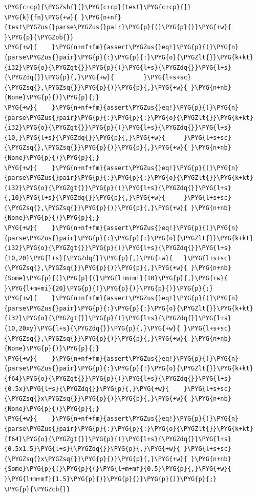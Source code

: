 \begin{Verbatim}[commandchars=\\\{\},breaklines=true,breakanywhere=true,fontsize=\codefont,xleftmargin=17bp]
\PYG{c+cp}{\PYGZsh{}[}\PYG{c+cp}{test}\PYG{c+cp}{]}
\PYG{k}{fn}\PYG{+w}{ }\PYG{n+nf}{test\PYGZus{}parse\PYGZus{}pair}\PYG{p}{(}\PYG{p}{)}\PYG{+w}{ }\PYG{p}{\PYGZob{}}
\PYG{+w}{    }\PYG{n+nf+fm}{assert\PYGZus{}eq!}\PYG{p}{(}\PYG{n}{parse\PYGZus{}pair}\PYG{p}{:}\PYG{p}{:}\PYG{o}{\PYGZlt{}}\PYG{k+kt}{i32}\PYG{o}{\PYGZgt{}}\PYG{p}{(}\PYG{l+s}{\PYGZdq{}}\PYG{l+s}{\PYGZdq{}}\PYG{p}{,}\PYG{+w}{        }\PYG{l+s+sc}{\PYGZsq{},\PYGZsq{}}\PYG{p}{)}\PYG{p}{,}\PYG{+w}{ }\PYG{n+nb}{None}\PYG{p}{)}\PYG{p}{;}
\PYG{+w}{    }\PYG{n+nf+fm}{assert\PYGZus{}eq!}\PYG{p}{(}\PYG{n}{parse\PYGZus{}pair}\PYG{p}{:}\PYG{p}{:}\PYG{o}{\PYGZlt{}}\PYG{k+kt}{i32}\PYG{o}{\PYGZgt{}}\PYG{p}{(}\PYG{l+s}{\PYGZdq{}}\PYG{l+s}{10,}\PYG{l+s}{\PYGZdq{}}\PYG{p}{,}\PYG{+w}{     }\PYG{l+s+sc}{\PYGZsq{},\PYGZsq{}}\PYG{p}{)}\PYG{p}{,}\PYG{+w}{ }\PYG{n+nb}{None}\PYG{p}{)}\PYG{p}{;}
\PYG{+w}{    }\PYG{n+nf+fm}{assert\PYGZus{}eq!}\PYG{p}{(}\PYG{n}{parse\PYGZus{}pair}\PYG{p}{:}\PYG{p}{:}\PYG{o}{\PYGZlt{}}\PYG{k+kt}{i32}\PYG{o}{\PYGZgt{}}\PYG{p}{(}\PYG{l+s}{\PYGZdq{}}\PYG{l+s}{,10}\PYG{l+s}{\PYGZdq{}}\PYG{p}{,}\PYG{+w}{     }\PYG{l+s+sc}{\PYGZsq{},\PYGZsq{}}\PYG{p}{)}\PYG{p}{,}\PYG{+w}{ }\PYG{n+nb}{None}\PYG{p}{)}\PYG{p}{;}
\PYG{+w}{    }\PYG{n+nf+fm}{assert\PYGZus{}eq!}\PYG{p}{(}\PYG{n}{parse\PYGZus{}pair}\PYG{p}{:}\PYG{p}{:}\PYG{o}{\PYGZlt{}}\PYG{k+kt}{i32}\PYG{o}{\PYGZgt{}}\PYG{p}{(}\PYG{l+s}{\PYGZdq{}}\PYG{l+s}{10,20}\PYG{l+s}{\PYGZdq{}}\PYG{p}{,}\PYG{+w}{   }\PYG{l+s+sc}{\PYGZsq{},\PYGZsq{}}\PYG{p}{)}\PYG{p}{,}\PYG{+w}{ }\PYG{n+nb}{Some}\PYG{p}{(}\PYG{p}{(}\PYG{l+m+mi}{10}\PYG{p}{,}\PYG{+w}{ }\PYG{l+m+mi}{20}\PYG{p}{)}\PYG{p}{)}\PYG{p}{)}\PYG{p}{;}
\PYG{+w}{    }\PYG{n+nf+fm}{assert\PYGZus{}eq!}\PYG{p}{(}\PYG{n}{parse\PYGZus{}pair}\PYG{p}{:}\PYG{p}{:}\PYG{o}{\PYGZlt{}}\PYG{k+kt}{i32}\PYG{o}{\PYGZgt{}}\PYG{p}{(}\PYG{l+s}{\PYGZdq{}}\PYG{l+s}{10,20xy}\PYG{l+s}{\PYGZdq{}}\PYG{p}{,}\PYG{+w}{ }\PYG{l+s+sc}{\PYGZsq{},\PYGZsq{}}\PYG{p}{)}\PYG{p}{,}\PYG{+w}{ }\PYG{n+nb}{None}\PYG{p}{)}\PYG{p}{;}
\PYG{+w}{    }\PYG{n+nf+fm}{assert\PYGZus{}eq!}\PYG{p}{(}\PYG{n}{parse\PYGZus{}pair}\PYG{p}{:}\PYG{p}{:}\PYG{o}{\PYGZlt{}}\PYG{k+kt}{f64}\PYG{o}{\PYGZgt{}}\PYG{p}{(}\PYG{l+s}{\PYGZdq{}}\PYG{l+s}{0.5x}\PYG{l+s}{\PYGZdq{}}\PYG{p}{,}\PYG{+w}{    }\PYG{l+s+sc}{\PYGZsq{}x\PYGZsq{}}\PYG{p}{)}\PYG{p}{,}\PYG{+w}{ }\PYG{n+nb}{None}\PYG{p}{)}\PYG{p}{;}
\PYG{+w}{    }\PYG{n+nf+fm}{assert\PYGZus{}eq!}\PYG{p}{(}\PYG{n}{parse\PYGZus{}pair}\PYG{p}{:}\PYG{p}{:}\PYG{o}{\PYGZlt{}}\PYG{k+kt}{f64}\PYG{o}{\PYGZgt{}}\PYG{p}{(}\PYG{l+s}{\PYGZdq{}}\PYG{l+s}{0.5x1.5}\PYG{l+s}{\PYGZdq{}}\PYG{p}{,}\PYG{+w}{ }\PYG{l+s+sc}{\PYGZsq{}x\PYGZsq{}}\PYG{p}{)}\PYG{p}{,}\PYG{+w}{ }\PYG{n+nb}{Some}\PYG{p}{(}\PYG{p}{(}\PYG{l+m+mf}{0.5}\PYG{p}{,}\PYG{+w}{ }\PYG{l+m+mf}{1.5}\PYG{p}{)}\PYG{p}{)}\PYG{p}{)}\PYG{p}{;}
\PYG{p}{\PYGZcb{}}
\end{Verbatim}

